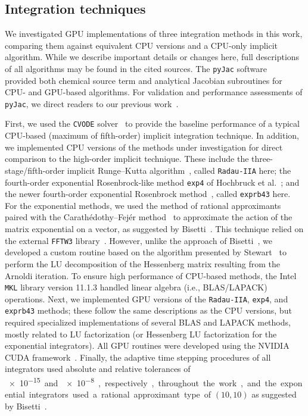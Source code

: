 \documentclass[preprint]{elsarticle}
\begin{document}
\subsection{Integration techniques}

We investigated GPU implementations of three integration methods in this work, comparing them against equivalent CPU versions and a CPU-only implicit algorithm.
While we describe important details or changes here, full descriptions of all algorithms may be found in the cited sources.
The \texttt{pyJac} software~\cite{Niemeyer:2015im,Niemeyer:2015ws} provided both chemical source term and analytical Jacobian subroutines for CPU- and GPU-based algorithms.
For validation and performance assessments of \texttt{pyJac}, we direct readers to our previous work~\cite{Niemeyer:2015ws}.

First, we used the \texttt{CVODE} solver~\cite{Hindmarsh:2005hg} to provide the baseline performance of a typical CPU-based (maximum of fifth-order) implicit integration technique.
In addition, we implemented CPU versions of the methods under investigation for direct comparison to the high-order implicit technique.
These include the three-stage/fifth-order implicit Runge--Kutta algorithm~\cite{wanner1991solving}, called \texttt{Radau-IIA} here; the fourth-order exponential Rosenbrock-like method \texttt{exp4} of Hochbruck et al.~\cite{Hochbruck:1998}; and the newer fourth-order exponential Rosenbrock method~\cite{Hockbruck:2009}, called \texttt{exprb43} here.
For the exponential methods, we used the method of rational approximants~\cite{gallopoulos:1992} paired with the Carath\'edothy--Fej\'er method~\cite{trefethen:2006} to approximate the action of the matrix exponential on a vector, as suggested by Bisetti~\cite{Bisetti:2012jw}.
This technique relied on the external \texttt{FFTW3} library~\cite{frigo2005design}.
However, unlike the approach of Bisetti~\cite{Bisetti:2012jw}, we developed a custom routine based on the algorithm presented by Stewart~\cite{stewart:1998} to perform the LU decomposition of the Hessenberg matrix resulting from the Arnoldi iteration.
To ensure high performance of CPU-based methods, the Intel \texttt{MKL} library version 11.1.3 handled linear algebra (i.e., BLAS/LAPACK) operations.
Next, we implemented GPU versions of the \texttt{Radau-IIA}, \texttt{exp4}, and \texttt{exprb43} methods; these follow the same descriptions as the CPU versions, but required specialized implementations of several BLAS and LAPACK methods, mostly related to LU factorization (or Hessenberg LU factorization for the exponential integrators).
All GPU routines were developed using the NVIDIA CUDA framework~\cite{Buck:2008aa,NVIDIA:2015aa}.
Finally, the adaptive time stepping procedures of all integrators used absolute and relative tolerances of \SI{e-15} and \SI{e-8}, respectively, throughout the work, and the exponential integrators used a rational approximant type of $\left(10,10\right)$ as suggested by Bisetti~\cite{Bisetti:2012jw}.
\end{document}
